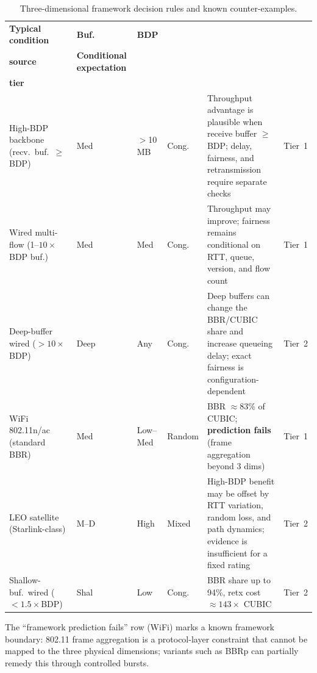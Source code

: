 \documentclass[a4paper,fleqn]{cas-sc}
\begin{document}
\begin{table}[pos=tbp]
  \caption{Three-dimensional framework decision rules and known counter-examples.}
  \label{tab:decision_rules}
  \small
  \begin{tabularx}{\tblwidth}{@{}p{3.8cm}p{1.0cm}p{1.3cm}p{1.6cm}Xp{1.3cm}@{}}
    \toprule
    \textbf{Typical condition} & \textbf{Buf.} & \textbf{BDP} & \makecell[l]{\textbf{Loss}\\\textbf{source}}
      & \textbf{Conditional expectation} & \makecell[l]{\textbf{Evidence}\\\textbf{tier}} \\
    \midrule
    High-BDP backbone (recv.\ buf.\ $\geq$BDP) & Med & $>$10\,MB & Cong.
      & Throughput advantage is plausible when receive buffer $\geq$BDP; delay, fairness, and retransmission require separate checks & Tier~1 \\
    \midrule
    Wired multi-flow (1--$10\times$BDP buf.) & Med & Med & Cong.
      & Throughput may improve; fairness remains conditional on RTT, queue, version, and flow count & Tier~1 \\
    \midrule
    Deep-buffer wired ($>10\times$BDP) & Deep & Any & Cong.
      & Deep buffers can change the BBR/CUBIC share and increase queueing delay; exact fairness is configuration-dependent & Tier~2 \\
    \midrule
    WiFi 802.11n/ac (standard BBR) & Med & Low--Med & Random
      & BBR $\approx\!83\%$ of CUBIC; \textbf{prediction fails} (frame aggregation beyond 3 dims) & Tier~1 \\
    \midrule
    LEO satellite (Starlink-class) & M--D & High & Mixed
      & High-BDP benefit may be offset by RTT variation, random loss, and path dynamics; evidence is insufficient for a fixed rating & Tier~2 \\
    \midrule
    Shallow-buf.\ wired ($<1.5\times$BDP) & Shal & Low & Cong.
      & BBR share up to 94\%, retx cost $\approx\!143\times$ CUBIC & Tier~2 \\
    \bottomrule
  \end{tabularx}
  \begin{tablenotes}
    \small
    \item The ``framework prediction fails'' row (WiFi) marks a known framework boundary:
    802.11 frame aggregation is a protocol-layer constraint that cannot be mapped to the
    three physical dimensions; variants such as BBRp can partially remedy this through
    controlled bursts.
  \end{tablenotes}
\end{table}
\end{document}
